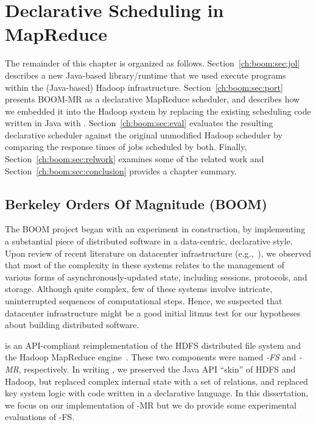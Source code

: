 \chapter[Declarative Scheduling in MapReduce]{Declarative Scheduling in MapReduce}
\label{ch:boom}

The remainder of this chapter is organized as follows.
Section~\ref{ch:boom:sec:jol} describes a new Java-based \OVERLOG
library/runtime that we used execute \OVERLOG programs within the (Java-based)
Hadoop infrastructure.  Section~\ref{ch:boom:sec:port} presents BOOM-MR as a
declarative MapReduce scheduler, and describes how we embedded it into the
Hadoop system by replacing the existing scheduling code written in Java with
\OVERLOG.  Section~\ref{ch:boom:sec:eval} evaluates the resulting declarative
scheduler against the original unmodified Hadoop scheduler by comparing the
response times of jobs scheduled by both.  Finally,
Section~\ref{ch:boom:sec:relwork} examines some of the related work and
Section~\ref{ch:boom:sec:conclusion} provides a chapter summary.

\section{Berkeley Orders Of Magnitude (BOOM)}

The BOOM project began with an experiment in construction, by implementing a
substantial piece of distributed software in a data-centric, declarative style.
Upon review of recent literature on datacenter infrastructure
(e.g.,~\cite{chubby,gfs-sosp,dynamo,mapreduce-osdi}), we observed that most of
the complexity in these systems relates to the management of various forms of
asynchronously-updated state, including sessions, protocols, and storage.
Although quite complex, few of these systems involve intricate, uninterrupted
sequences of computational steps.  Hence, we suspected that datacenter
infrastructure might be a good initial litmus test for our hypotheses about
building distributed software.

\emph{\BOOMA} is an API-compliant reimplementation of the HDFS distributed file
system and the Hadoop MapReduce engine~\cite{boom}.  These two components were
named \emph{\BOOM-FS} and \emph{\BOOM-MR}, respectively.  In writing \BOOMA, we
preserved the Java API ``skin'' of HDFS and Hadoop, but replaced complex
internal state with a set of relations, and replaced key system logic with code
written in a declarative language.  In this dissertation, we focus on our
implementation of \BOOM-MR but we do provide some experimental evaluations of
\BOOM-FS.

